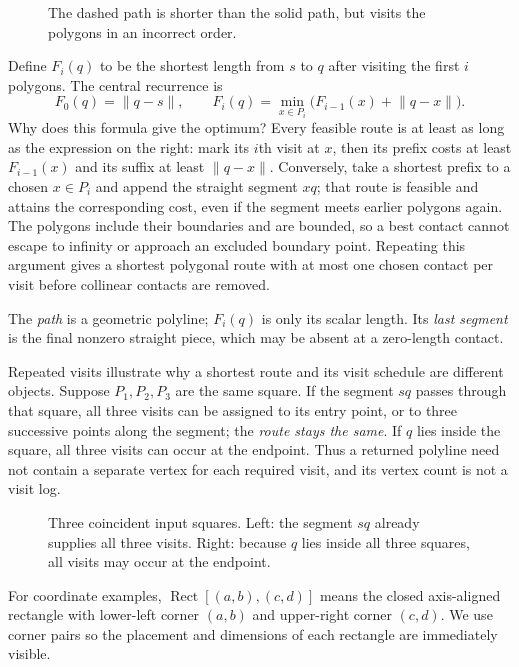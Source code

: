 \documentclass[12pt,a4paper]{article}
\newcommand{\norm}[1]{\lVert#1\rVert}
\newcommand{\Rect}[2]{\operatorname{Rect}\!\left[#1,#2\right]}
\begin{document}
\begin{figure}[h]\centering\figordered\caption{The dashed path is shorter than the solid path, but visits the polygons in an incorrect order.}\label{fig:order}\end{figure}

Define \(F_i(q)\) to be the shortest length from \(s\) to \(q\) after visiting the first \(i\) polygons. The central recurrence is
\begin{equation}\label{eq:prefix}
F_0(q)=\norm{q-s},\qquad
F_i(q)=\min_{x\in P_i}\bigl(F_{i-1}(x)+\norm{q-x}\bigr).
\end{equation}
Why does this formula give the optimum? Every feasible route is at least as long as the expression on the right: mark its \(i\)th visit at \(x\), then its prefix costs at least \(F_{i-1}(x)\) and its suffix at least \(\norm{q-x}\). Conversely, take a shortest prefix to a chosen \(x\in P_i\) and append the straight segment \(xq\); that route is feasible and attains the corresponding cost, even if the segment meets earlier polygons again. The polygons include their boundaries and are bounded, so a best contact cannot escape to infinity or approach an excluded boundary point. Repeating this argument gives a shortest polygonal route with at most one chosen contact per visit before collinear contacts are removed.

The \emph{path} is a geometric polyline; \(F_i(q)\) is only its scalar length. Its \emph{last segment} is the final nonzero straight piece, which may be absent at a zero-length contact.

Repeated visits illustrate why a shortest route and its visit schedule are different objects. Suppose \(P_1,P_2,P_3\) are the same square. If the segment \(sq\) passes through that square, all three visits can be assigned to its entry point, or to three successive points along the segment; the \emph{route stays the same}. If \(q\) lies inside the square, all three visits can occur at the endpoint. Thus a returned polyline need not contain a separate vertex for each required visit, and its vertex count is not a visit log.

\begin{figure}[h]\centering\figrepeat\caption{Three coincident input squares. Left: the segment \(sq\) already supplies all three visits. Right: because \(q\) lies inside all three squares, all visits may occur at the endpoint.}\label{fig:repeat}\end{figure}

For coordinate examples, \(\Rect{(a,b)}{(c,d)}\) means the closed axis-aligned rectangle with lower-left corner \((a,b)\) and upper-right corner \((c,d)\). We use corner pairs so the placement and dimensions of each rectangle are immediately visible.
\end{document}

